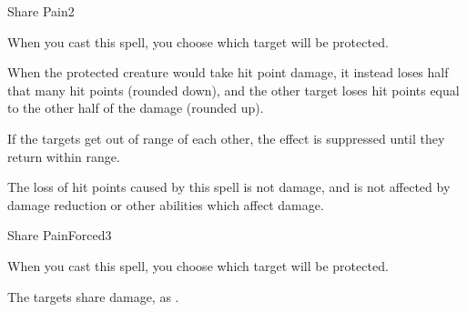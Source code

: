 \begin{spellsection}{Share Pain}{2}
\begin{spellheader}
    \begin{spelltargetinginfo}
    \end{spelltargetinginfo}
    \begin{spelleffects}
        \spellspecial When you cast this spell, you choose which target will be protected.
    \end{spelleffects}
\end{spellheader}
\begin{spellcontent}
    \spelleffect When the protected creature would take hit point damage, it instead loses half that many hit points (rounded down), and the other target loses hit points equal to the other half of the damage (rounded up).

    If the targets get out of range of each other, the effect is suppressed until they return within range.
    \spelldur \durlong \dismissable
\end{spellcontent}
\begin{spellfooter}
    \spellnotes The loss of hit points caused by this spell is not damage, and is not affected by damage reduction or other abilities which affect damage.
\end{spellfooter}
\end{spellsection}

\begin{spellsection}{Share Pain}{Forced}{3}
\begin{spellheader}
    \begin{spelltargetinginfo}
    \end{spelltargetinginfo}
    \begin{spelleffects}
        \spellspecial When you cast this spell, you choose which target will be protected.
    \end{spelleffects}
\end{spellheader}
\begin{spellcontent}
    \begin{spellmargin}
        \spellsuccess The targets share damage, as .
    \end{spellmargin}
    \spelldur \durlong \dismissable
\end{spellcontent}
\begin{spellfooter}
\end{spellfooter}
\end{spellsection}

